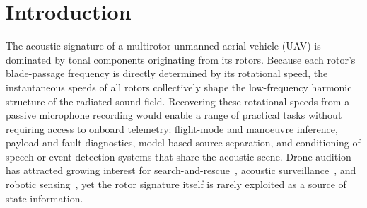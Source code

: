 \documentclass{QD_2026}
\begin{document}



\section{Introduction}

The acoustic signature of a multirotor unmanned aerial vehicle (UAV) is dominated
by tonal components originating from its rotors. Because each rotor's blade-passage
frequency is directly determined by its rotational speed, the instantaneous speeds
of all rotors collectively shape the low-frequency harmonic structure of the radiated
sound field. Recovering these rotational speeds from a passive microphone recording
would enable a range of practical tasks without requiring access to onboard
telemetry: flight-mode and manoeuvre inference, payload and fault diagnostics,
model-based source separation, and conditioning of speech or event-detection
systems that share the acoustic scene.
Drone audition has attracted growing interest for search-and-rescue~\cite{tan2025droneaudioset,wang2026skyear}, acoustic surveillance~\cite{garcia2025multiclass}, and robotic sensing~\cite{singh2025review}, yet the rotor signature itself is rarely exploited as a source of state information.
\end{document}
